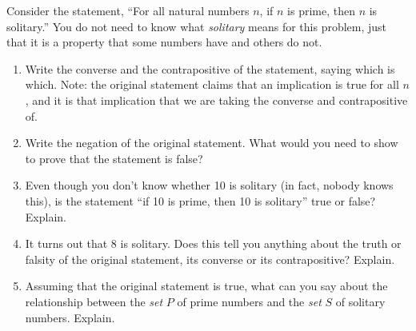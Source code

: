 \documentclass[11pt,]{book}
\theoremstyle{ptxplainnotitle}
\theoremstyle{ptxplaintitle}
\theoremstyle{ptxdefinitionnotitle}
\theoremstyle{ptxdefinitiontitle}
\theoremstyle{ptxdefinitionnotitle}
\theoremstyle{ptxdefinitiontitle}
\theoremstyle{ptxdefinitionnotitle}
\theoremstyle{ptxdefinitiontitle}
\theoremstyle{ptxdefinitiontitlenonumber}
\theoremstyle{ptxdefinitiontitlenonumber}
\numberwithin{equation}{chapter}
\begin{document}
\begin{divisionexercise}{21}\hypertarget{exercise-169}{}
\hypertarget{p-2348}{}%
Consider the statement, ``For all natural numbers \(n\), if \(n\) is prime, then \(n\) is solitary.''  You do not need to know what \emph{solitary} means for this problem, just that it is a property that some numbers have and others do not. \leavevmode%
\begin{enumerate}[label=(\alph*)]
\item\hypertarget{li-1231}{}\hypertarget{p-2349}{}%
Write the converse and the contrapositive of the statement, saying which is which.  Note: the original statement claims that an implication is true for all \(n\), and it is that implication that we are taking the converse and contrapositive of.%
\item\hypertarget{li-1232}{}\hypertarget{p-2350}{}%
Write the negation of the original statement.  What would you need to show to prove that the statement is false?%
\item\hypertarget{li-1233}{}\hypertarget{p-2351}{}%
Even though you don't know whether 10 is solitary (in fact, nobody knows this), is the statement ``if 10 is prime, then 10 is solitary'' true or false?  Explain.%
\item\hypertarget{li-1234}{}\hypertarget{p-2352}{}%
It turns out that 8 is solitary.  Does this tell you anything about the truth or falsity of the original statement, its converse or its contrapositive?  Explain.%
\item\hypertarget{li-1235}{}\hypertarget{p-2353}{}%
Assuming that the original statement is true, what can you say about the relationship between the \emph{set} \(P\) of prime numbers and the \emph{set} \(S\) of solitary numbers.  Explain.%
\end{enumerate}
%
\end{divisionexercise}%
\end{document}
